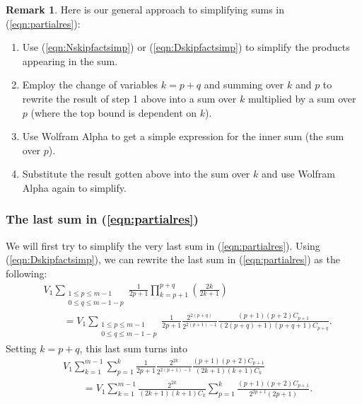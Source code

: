 \documentclass[11pt]{article}
\theoremstyle{definition}
\theoremstyle{definition}
\theoremstyle{plain}
\theoremstyle{plain}
\theoremstyle{plain}
\theoremstyle{definition}
\theoremstyle{definition}
\newtheorem{rem}[prop]{Remark}
\begin{document}
{\begin{rem}
Here is our general approach to simplifying sums in (\ref{eqn:partialres}):
\begin{enumerate}[label=\arabic*.]
\item Use (\ref{eqn:Nskipfactsimp}) or (\ref{eqn:Dskipfactsimp}) to simplify the products appearing in the sum.
\item Employ the change of variables $k = p+q$ and summing over $k$ and $p$ to rewrite the result of step 1 above into a sum over $k$ multiplied by a sum over $p$ (where the top bound is dependent on $k$).
\item Use Wolfram Alpha to get a simple expression for the inner sum (the sum over $p$).
\item Substitute the result gotten above into the sum over $k$ and use Wolfram Alpha again to simplify.
\end{enumerate}
\end{rem}

\subsubsection*{The last sum in (\ref{eqn:partialres})}

We will first try to simplify the very last sum in (\ref{eqn:partialres}). Using (\ref{eqn:Dskipfactsimp}), we can rewrite the last sum in (\ref{eqn:partialres}) as the following:
\begin{align*}
&V_{1}\sum\limits_{\substack{1\leq p \leq m-1 \\ 0 \leq q \leq m - 1 - p}}\frac{1}{2p+1}\prod\limits_{k=p+1}^{p+q}\left(\frac{2k}{2k+1}\right) \\
&\qquad= V_1\sum\limits_{\substack{1\leq p \leq m-1 \\ 0 \leq q \leq m-1-p}} \frac{1}{2p+1}\frac{2^{2(p+q)}}{2^{2(p+1)-1}}\frac{(p+1)(p+2)C_{p+1}}{(2(p+q)+1)(p+q+1)C_{p+q}}.
\end{align*}
Setting $k = p+q$, this last sum turns into
\begin{equation}
\begin{aligned}\label{eqn:lastvarchange}
&V_1\sum\limits_{k=1}^{m-1}\sum\limits_{p=1}^k\frac{1}{2p+1}\frac{2^{2k}}{2^{2(p+1)-1}}\frac{(p+1)(p+2)C_{p+1}}{(2k+1)(k+1)C_k} \\
&\qquad= V_1\sum\limits_{k=1}^{m-1}\frac{2^{2k}}{(2k+1)(k+1)C_k}\sum\limits_{p=1}^k\frac{(p+1)(p+2)C_{p+1}}{2^{2p+1}(2p+1)}.
\end{aligned}
\end{equation}

}
\end{document}
